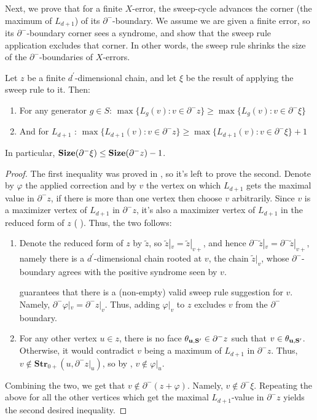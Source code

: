 


Next, we prove that for a finite $X$-error, the sweep-cycle advances the corner (the maximum of $L_{d+1}$) of its $\partial^{-}$-boundary. We assume we are given a finite error, so its $\partial^{-}$-boundary corner sees a syndrome, and show that the sweep rule application excludes that corner. In other words, the sweep rule shrinks the size of the $\partial^{-}$-boundaries of $X$-errors.

\begin{claim}
  \label{claim:sweepshrink}
Let $z$ be a finite $d^{\prime}$-dimensional chain, and let $\xi$ be the result of applying the sweep rule to it. Then:
  \begin{enumerate}
    \item For any generator $g \in S$: $\max \big\{ L_{g}(v) : v \in \partial^{-} z \big\} \ge \max \big\{ L_{g}(v) : v \in \partial^{-} \xi \big\}  $
    \item And for $L_{d+1}$ : $ \max \big\{ L_{d+1}(v)  : v \in \partial^{-} z \big\} \ge \max \big\{  L_{d+1}(v) : v \in \partial^{-}\xi \big\} + 1$
  \end{enumerate}
  In particular, $\mathbf{Size}( \partial^{-}\xi) \le \mathbf{Size}(\partial^{-}z) - 1$.
\end{claim}
\begin{proof}
  The first inequality was proved in , so it's left to prove the second. Denote by $\varphi$ the applied correction and by $v$ the vertex on which $L_{d+1}$ gets the maximal value in $\partial^{-} z$, if there is more than one vertex then choose $v$ arbitrarily. Since $v$ is a maximizer vertex of $L_{d+1}$ in $\partial^{-} z$, it's also a maximizer vertex of $L_{d+1}$ in the reduced form of $z$ (  ). Thus, the two follows: 
  \begin{enumerate}
    \item Denote the reduced form of $z$ by $\tilde{z}$, so $\tilde{z}|_{v} = \tilde{z}|_{v+}$, and hence $\partial^{-}\tilde{z}|_{v} = \partial^{-}\tilde{z}|_{v+}$, namely there is a $d^{\prime}$-dimensional chain rooted at $v$, the chain $\tilde{z}|_{v}$, whose $\partial^{-}$-boundary agrees with the positive syndrome seen by $v$.

       guarantees that there is a (non-empty) valid sweep rule suggestion for $v$. Namely, $\partial^{-} \varphi|_{v} = \partial^{-} z|_{v}$. Thus, adding $\varphi|_{v}$ to $z$ excludes $v$ from the $\partial^{-}$ boundary.
    \item For any other vertex $u \in z$, there is no face $\mathbf{\theta_{u ,S^{\prime}} } \in \partial^{-} z$ such that $v \in \mathbf{\theta_{u ,S^{\prime}} }$. Otherwise, it would contradict $v$ being a maximum of $L_{d+1}$ in $\partial^{-} z$. Thus, $v \notin \textbf{Str}_{0+}(u, \partial^{-} z|_{u})$, so by , $v \notin \varphi|_{u}$.
  \end{enumerate}
Combining the two, we get that $v \notin \partial^{-} (z + \varphi)$. Namely, $v \notin \partial^{-}\xi$. Repeating the above for all the other vertices which get the maximal $L_{d+1}$-value in $\partial^{-} z$ yields the second desired inequality.

\end{proof}

